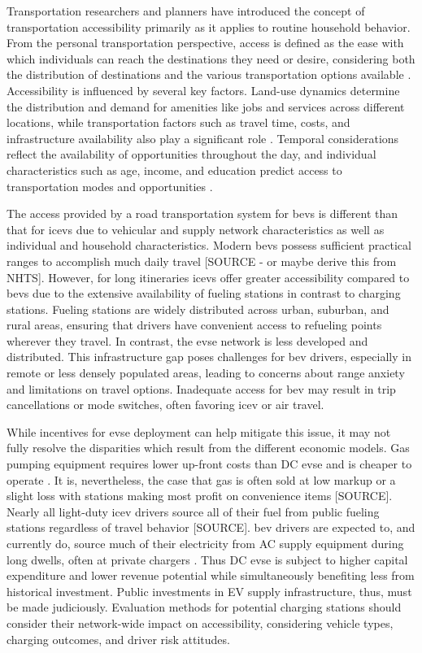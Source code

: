\documentclass[12pt]{article}
\begin{document}
Transportation researchers and planners have introduced the concept of transportation accessibility primarily as it applies to routine household behavior. From the personal transportation perspective, access is defined as the ease with which individuals can reach the destinations they need or desire, considering both the distribution of destinations and the various transportation options available \cite{Handy_2020}. Accessibility is influenced by several key factors. Land-use dynamics determine the distribution and demand for amenities like jobs and services across different locations, while transportation factors such as travel time, costs, and infrastructure availability also play a significant role \cite{Geurs_2004}. Temporal considerations reflect the availability of opportunities throughout the day, and individual characteristics such as age, income, and education predict access to transportation modes and opportunities \cite{Miller_2018}.

The access provided by a road transportation system for \glspl{bev} is different than that for \glspl{icev} due to vehicular and supply network characteristics as well as individual and household characteristics. Modern \glspl{bev} possess sufficient practical ranges to accomplish much daily travel [SOURCE - or maybe derive this from NHTS]. However, for long itineraries \glspl{icev} offer greater accessibility compared to \glspl{bev} due to the extensive availability of fueling stations in contrast to charging stations. Fueling stations are widely distributed across urban, suburban, and rural areas, ensuring that drivers have convenient access to refueling points wherever they travel. In contrast, the \gls{evse} network is less developed and distributed. This infrastructure gap poses challenges for \gls{bev} drivers, especially in remote or less densely populated areas, leading to concerns about range anxiety and limitations on travel options. Inadequate access for \gls{bev} may result in trip cancellations or mode switches, often favoring \gls{icev} or air travel.

While incentives for \gls{evse} deployment can help mitigate this issue, it may not fully resolve the disparities which result from the different economic models. Gas pumping equipment requires lower up-front costs than DC \gls{evse} and is cheaper to operate \cite{Gamage_2023}. It is, nevertheless, the case that gas is often sold at low markup or a slight loss with stations making most profit on convenience items [SOURCE]. Nearly all light-duty \gls{icev} drivers source all of their fuel from public fueling stations regardless of travel behavior [SOURCE]. \gls{bev} drivers are expected to, and currently do, source much of their electricity from AC supply equipment during long dwells, often at private chargers \cite{Hardman_2018}. Thus DC \gls{evse} is subject to higher capital expenditure and lower revenue potential while simultaneously benefiting less from historical investment. Public investments in EV supply infrastructure, thus, must be made judiciously. Evaluation methods for potential charging stations should consider their network-wide impact on accessibility, considering vehicle types, charging outcomes, and driver risk attitudes.
\end{document}
